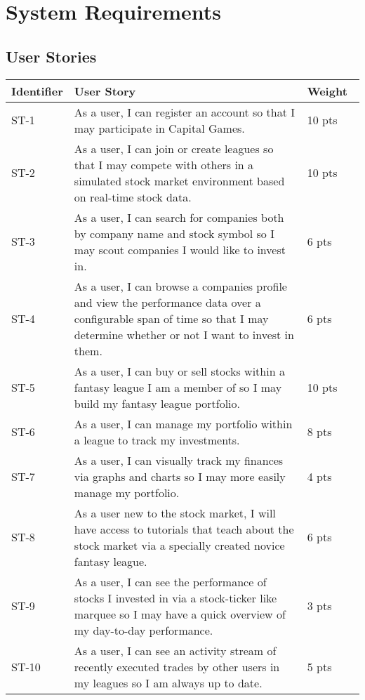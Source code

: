 \chapter{System Requirements}

\section{User Stories}

\renewcommand\arraystretch{2}
\begin{longtable}{|p{0.6in}|p{4.6in}|p{0.5in}|}
\hline
{\large \color{color1}Identifier}&{\large \color{color1}User Story}&{\large \color{color1}Weight} \\ \hline
ST-1&As a user, I can register an account so that I may participate in Capital Games.&10 pts \\ \hline 
ST-2&As a user, I can join or create leagues so that I may compete with others in a simulated stock market environment based on real-time stock data.&10 pts \\ \hline 
ST-3&As a user, I can search for companies both by company name and stock symbol so I may scout companies I would like to invest in.&6 pts  \\ \hline 
ST-4&As a user, I can browse a companies profile and view the performance data over a configurable span of time so that I may determine whether or not I want to invest in them.&6 pts  \\ \hline 
ST-5&As a user, I can buy or sell stocks within a fantasy league I am a member of so I may build my fantasy league portfolio.&10 pts \\ \hline 
ST-6&As a user, I can manage my portfolio within a league to track my investments.&8 pts  \\ \hline 
ST-7&As a user, I can visually track my finances via graphs and charts so I may more easily manage my portfolio.&4 pts  \\ \hline 
ST-8&As a user new to the stock market, I will have access to tutorials that teach about the stock market via a specially created novice fantasy league.&6 pts  \\ \hline 
ST-9&As a user, I can see the performance of stocks I invested in via a stock-ticker like marquee so I may have a quick overview of my day-to-day performance.&3 pts  \\ \hline 
ST-10&As a user, I can see an activity stream of recently executed trades by other users in my leagues so I am always up to date.&5 pts  \\ \hline 

\end{longtable}
